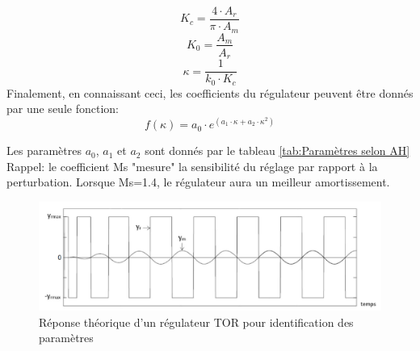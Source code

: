 \begin{equation}
	K_c=\frac{4\cdot A_r}{\pi \cdot A_m}
	\label{eq:gain critique}
\end{equation}
\begin{equation}
	K_0=\frac{A_m}{A_r}
	\label{eq:gain statique}
\end{equation}
\begin{equation}
	\kappa=\frac{1}{k_0 \cdot K_c}
	\label{eq:gain relatif}
\end{equation}
Finalement, en connaissant ceci, les coefficients du régulateur peuvent être donnés par une seule fonction:
\begin{equation}
	f(\kappa)=a_0\cdot e^{(a_1\cdot \kappa+ a_2 \cdot \kappa^2)}
	\label{eq:AH}
\end{equation}

Les paramètres $a_0$, $a_1$ et $a_2$ sont donnés par le tableau \ref{tab:Paramètres selon AH}\\
Rappel: le coefficient Ms "mesure" la sensibilité du réglage par rapport à la perturbation. Lorsque Ms=1.4, le régulateur aura un meilleur amortissement. \cite{AHAut} \cite{Lalou}

\begin{figure}[h]
	\centering
	\includegraphics[width=\linewidth]{img/RepTorTheorie}
	\caption{Réponse théorique d'un régulateur TOR pour identification des paramètres}
	\label{fig:Réponse théorique d'un régulateur TOR pour identification des paramètres}
\end{figure}	

